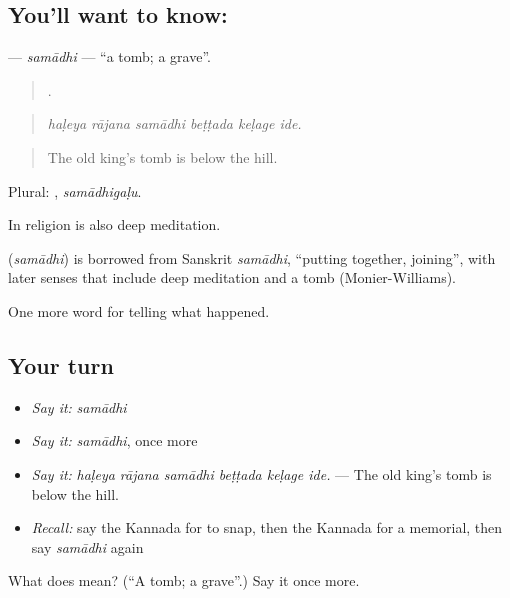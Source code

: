 \subsection*{You'll want to know: }
\textbf{} — \emph{samādhi} — \textquotedblleft{}a tomb; a grave\textquotedblright{}.

\begin{quote}
     .
\end{quote}

\begin{quote}
\emph{haḷeya rājana samādhi beṭṭada keḷage ide.}
\end{quote}

\begin{quote}
The old king's tomb is below the hill.
\end{quote}

Plural: , \emph{samādhigaḷu}.

In religion  is also deep meditation.

\begin{cousinweb}
\textbf{} (\emph{samādhi}) is borrowed from Sanskrit \emph{samādhi}, \textquotedblleft{}putting together, joining\textquotedblright{}, with later senses that include deep meditation and a tomb (Monier-Williams).
\end{cousinweb}

\begin{grammarlens}[title={What you've built}]
One more word for telling what happened.
\end{grammarlens}

\subsection*{Your turn}
\begin{itemize}
\raggedright
  \item \emph{Say it:} \emph{samādhi}
  \item \emph{Say it:} \emph{samādhi}, once more
  \item \emph{Say it:} \emph{haḷeya rājana samādhi beṭṭada keḷage ide.} — The old king's tomb is below the hill.
  \item \emph{Recall:} say the Kannada for to snap, then the Kannada for a memorial, then say \emph{samādhi} again
\end{itemize}

\begin{tcolorbox}[breakable,colback=teal!4,colframe=teal!35!black,title={Before you move on}]
What does  mean? (\textquotedblleft{}A tomb; a grave\textquotedblright{}.) Say it once more.
\end{tcolorbox}
